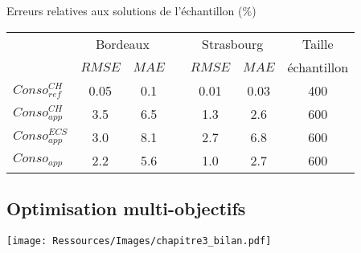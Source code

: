 \documentclass[xcolor=x11names, compress, 11pt]{beamer}
\begin{document}
\begin{frame}[c]
    \vfill
    \centering
    \tiny
    \begin{table}
    Erreurs relatives aux solutions de l’échantillon (\si{\percent})
    \vfill
    \begin{tabular}{l c c c c c c}
        \toprule
                        & \multicolumn{2}{c}{Bordeaux} & & \multicolumn{2}{c}{Strasbourg} &
                          Taille \\
                        \cmidrule(r){2-3}
                        \cmidrule(r){5-6}
                        & $RMSE$ & $MAE$   &       & $RMSE$ & $MAE$ & échantillon \\
        \midrule
        $Conso_{ref}^{CH}$  & \num{0.05}  & \num{0.1}  &  & \num{0.01}   & \num{0.03}  & \num{400}  \\
        \addlinespace[\defaultaddspace]
        $Conso_{app}^{CH}$  & \num{3.5}  & \num{6.5} &  & \num{1.3}   & \num{2.6}  & \num{600} \\
        \addlinespace[\defaultaddspace]
        $Conso_{app}^{ECS}$ & \num{3.0} & \num{8.1} & & \num{2.7}   & \num{6.8}  & \num{600} \\
        \addlinespace[\defaultaddspace]
        $Conso_{app}$       & \num{2.2} & \num{5.6} & & \num{1.0}   & \num{2.7}  & \num{600} \\
        \bottomrule
    \end{tabular}
    \end{table}
    \vfill
    \vfill
\end{frame}



\subsection{Optimisation multi-objectifs}
\begin{frame}[t]
    \vfill
    \centering
    \texttt{[image: Ressources/Images/chapitre3\_bilan.pdf]}
    \vfill
\end{frame}
\end{document}
